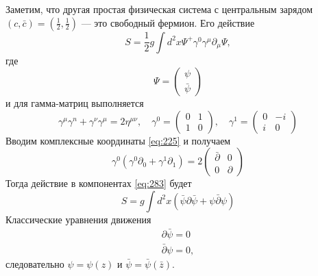 \documentclass[a4paper,12pt]{article}
\theoremstyle{definition}
\theoremstyle{definition}
\theoremstyle{definition}
\begin{document}
Заметим, что другая простая физическая система с центральным зарядом $(c,\bar c)=\left(\frac{1}{2},\frac{1}{2}\right)$ --- это свободный фермион. Его действие
\begin{equation}
  \label{eq:282}
  S=\frac{1}{2} g \int d^{2}x\Psi^{+}\gamma^{0}\gamma^{\mu}\partial_{\mu}\Psi,
\end{equation}
где
\begin{equation}
  \label{eq:283}
  \Psi=
  \begin{pmatrix}
    \psi\\ \bar \psi
  \end{pmatrix}
\end{equation}
и для гамма-матриц выполняется
\begin{equation}
  \label{eq:284}
  \gamma^{\mu}\gamma^{n}+\gamma^{\nu}\gamma^{\mu}=2\eta^{\mu\nu},\quad \gamma^{0}=
  \begin{pmatrix}
    0 & 1\\
    1 & 0
  \end{pmatrix}, \quad
  \gamma^{1}=
  \begin{pmatrix}
    0 & -i\\
    i & 0
  \end{pmatrix}
\end{equation}
Вводим комплексные координаты \eqref{eq:225} и получаем
\begin{equation}
  \label{eq:285}
  \gamma^{0}(\gamma^{0}\partial_{0}+\gamma^{1}\partial_{1})=2
  \begin{pmatrix}
    \bar \partial & 0\\
    0 & \partial
  \end{pmatrix}
\end{equation}
Тогда действие в компонентах \eqref{eq:283} будет
\begin{equation}
  \label{eq:286}
  S=g\int d^{2}x (\bar \psi \partial \bar \psi + \psi\bar \partial \psi)
\end{equation}
Классические уравнения движения
\begin{eqnarray}
  \label{eq:287}
  \partial \bar \psi=0\\
  \bar \partial \psi=0, 
\end{eqnarray}
следовательно $\psi=\psi(z)$ и $\bar \psi=\bar \psi(\bar z)$. 
\end{document}
